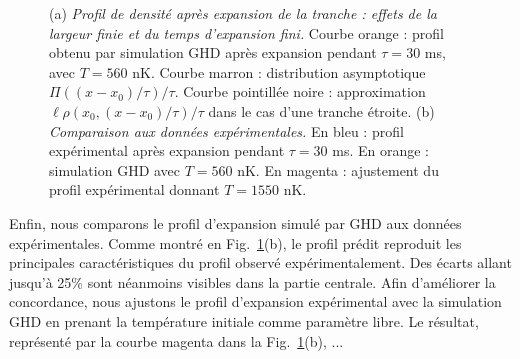 


\begin{figure}[!htb]
\centering
{}
\caption{(a) {\it Profil de densité après expansion de la tranche : effets de la largeur finie et du temps d’expansion fini.} Courbe orange : profil obtenu par simulation GHD après expansion pendant $\tau = 30$ ms, avec $T = 560$ nK. Courbe marron : distribution asymptotique $\Pi((x - x_0)/\tau)/\tau$. Courbe pointillée noire : approximation $\ell \rho(x_0, (x - x_0)/\tau)/\tau$ dans le cas d’une tranche étroite. (b) {\it Comparaison aux données expérimentales.} En bleu : profil expérimental après expansion pendant $\tau = 30$ ms. En orange : simulation GHD avec $T = 560$ nK. En magenta : ajustement du profil expérimental donnant $T = 1550$ nK.}
\label{fig:simul_expansion}
\end{figure}

Enfin, nous comparons le profil d’expansion simulé par GHD aux données expérimentales.  
Comme montré en Fig.~\ref{fig:simul_expansion}(b), le profil prédit reproduit les principales caractéristiques du profil observé expérimentalement.  
Des écarts allant jusqu’à 25\% sont néanmoins visibles dans la partie centrale.  
Afin d’améliorer la concordance, nous ajustons le profil d’expansion expérimental avec la simulation GHD en prenant la température initiale comme paramètre libre.  
Le résultat, représenté par la courbe magenta dans la Fig.~\ref{fig:simul_expansion}(b), ...

